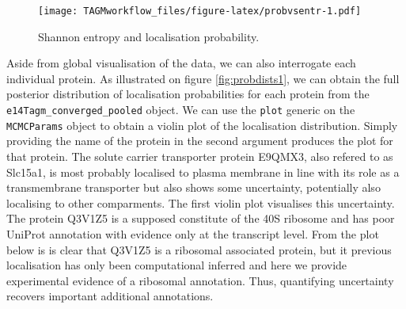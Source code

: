 \documentclass[]{article}
\newenvironment{Shaded}{\begin{snugshade}}{\end{snugshade}}
\newcommand{\KeywordTok}[1]{\textcolor[rgb]{0.13,0.29,0.53}{\textbf{{#1}}}}
\newcommand{\DataTypeTok}[1]{\textcolor[rgb]{0.13,0.29,0.53}{{#1}}}
\newcommand{\DecValTok}[1]{\textcolor[rgb]{0.00,0.00,0.81}{{#1}}}
\newcommand{\FloatTok}[1]{\textcolor[rgb]{0.00,0.00,0.81}{{#1}}}
\newcommand{\StringTok}[1]{\textcolor[rgb]{0.31,0.60,0.02}{{#1}}}
\newcommand{\NormalTok}[1]{{#1}}
\begin{document}
\begin{Shaded}
\end{Shaded}

\begin{figure}[htbp]
\centering
\texttt{[image: TAGMworkflow\_files/figure-latex/probvsentr-1.pdf]}
\caption{\label{fig:probvsentr}Shannon entropy and localisation
probability.}
\end{figure}

Aside from global visualisation of the data, we can also interrogate
each individual protein. As illustrated on figure \ref{fig:probdists1},
we can obtain the full posterior distribution of localisation
probabilities for each protein from the
\texttt{e14Tagm\_converged\_pooled} object. We can use the \texttt{plot}
generic on the \texttt{MCMCParams} object to obtain a violin plot of the
localisation distribution. Simply providing the name of the protein in
the second argument produces the plot for that protein. The solute
carrier transporter protein E9QMX3, also refered to as Slc15a1, is most
probably localised to plasma membrane in line with its role as a
transmembrane transporter but also shows some uncertainty, potentially
also localising to other comparments. The first violin plot visualises
this uncertainty. The protein Q3V1Z5 is a supposed constitute of the 40S
ribosome and has poor UniProt annotation with evidence only at the
transcript level. From the plot below is is clear that Q3V1Z5 is a
ribosomal associated protein, but it previous localisation has only been
computational inferred and here we provide experimental evidence of a
ribosomal annotation. Thus, quantifying uncertainty recovers important
additional annotations.
\end{document}
